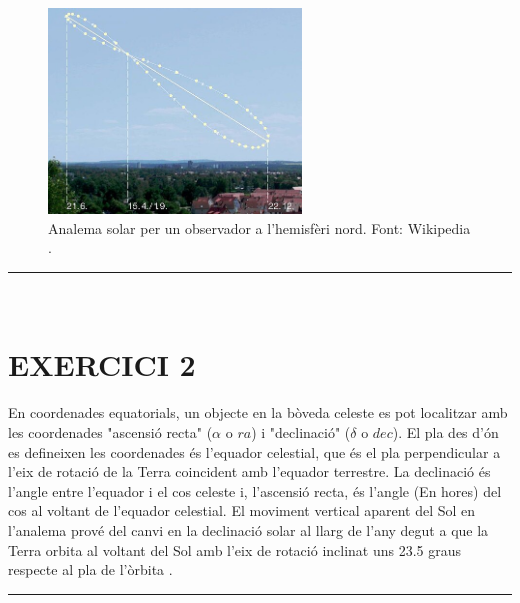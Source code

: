\documentclass[a4paper, 11pt]{article}
\begin{document}
\begin{figure}[h!]
    \centering
    \includegraphics[width=0.6\textwidth]{images/analema.png}
    \caption{Analema solar per un observador a l'hemisfèri nord. Font: Wikipedia \cite{DEFINICIO_ANALEMA}.}
    \label{fig:analema}
\end{figure}
\vspace{10mm}
\hrule\
\vspace{5mm}



\section*{EXERCICI 2}
\noindent  En coordenades equatorials, un objecte en la bòveda celeste es pot localitzar amb les coordenades "ascensió recta" ($\alpha$ o $ra$) i "declinació" ($\delta$ o $dec$). El pla des d'ón es defineixen les coordenades és l'equador celestial, que és el pla perpendicular a l'eix de rotació de la Terra coincident amb l'equador terrestre. La declinació és l'angle entre l'equador i el cos celeste i, l'ascensió recta, és l'angle (En hores) del cos al voltant de l'equador celestial. El moviment vertical aparent del Sol en l'analema prové del canvi en la declinació solar al llarg de l'any degut a que la Terra orbita al voltant del Sol amb l'eix de rotació inclinat uns 23.5 graus respecte al pla de l'òrbita \cite{ANALEMA_WIKI}.
\vspace{10mm}
\hrule\
\vspace{5mm}

\end{document}
